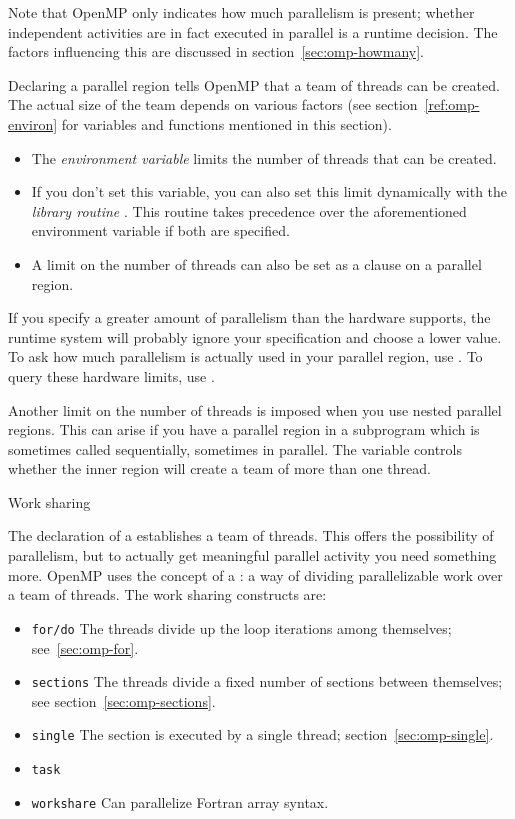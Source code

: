Note that OpenMP only indicates how much parallelism is present;
whether independent activities are in fact executed in parallel
is a runtime decision. The factors influencing this are discussed
in section~\ref{sec:omp-howmany}.

Declaring a parallel region tells OpenMP that a team of threads can be created.
The actual size of the team depends on various factors (see section~\ref{ref:omp-environ}
for variables and functions mentioned in this section).
\begin{itemize}
\item The \emph{environment variable}
   limits the number of
  threads that can be created.
\item If you don't set this variable, you can also set this limit
  dynamically with the \emph{library routine} . This routine takes
  precedence over the aforementioned environment variable if both are
  specified.
\item A limit on the number of threads can also be set as a clause
  on a parallel region.
\end{itemize}
If you specify a greater amount of parallelism than the hardware supports,
the runtime system will probably ignore your specification and choose a lower value.
To ask how much parallelism is actually used in your parallel region,
use . To query these hardware limits,
use .

Another limit on the number of threads is imposed when you use nested parallel regions.
This can arise if you have a parallel region in a subprogram which is sometimes called
sequentially, sometimes in parallel. The variable  controls
whether the inner region will create a team of more than one thread.

 {Work sharing}

The declaration of a  establishes a team of
threads. This offers the possibility of parallelism, but to actually
get meaningful parallel activity you need something more.
OpenMP uses the concept of a : a way of dividing parallelizable work over a team of threads.
The work sharing constructs are:
\begin{itemize}
\item \texttt{for/do} The threads divide up the loop iterations among
  themselves; see~\ref{sec:omp-for}.
\item \texttt{sections} The threads divide a fixed number of sections
  between themselves; see section~\ref{sec:omp-sections}.
\item \texttt{single} The section is executed by a single thread; section~\ref{sec:omp-single}.
\item \texttt{task}
\item \texttt{workshare} Can parallelize Fortran array syntax.
\end{itemize}

